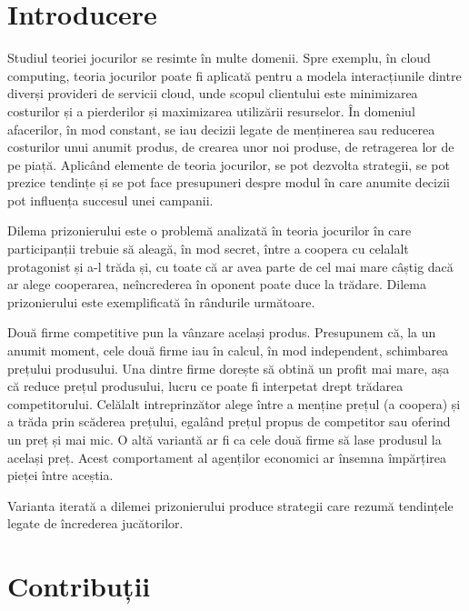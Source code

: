 \chapter*{Introducere}

Studiul teoriei jocurilor se resimte în multe domenii. Spre exemplu, în cloud computing, teoria jocurilor poate fi aplicată pentru a modela interacțiunile dintre diverși provideri de servicii cloud, unde scopul clientului este minimizarea costurilor și a pierderilor și maximizarea utilizării resurselor. În domeniul afacerilor, în mod constant, se iau decizii legate de menținerea sau reducerea costurilor unui anumit produs, de crearea unor noi produse, de retragerea lor de pe piață. Aplicând elemente de teoria jocurilor, se pot dezvolta strategii, se pot prezice tendințe și se pot face presupuneri despre modul în care anumite decizii pot influența succesul unei campanii. 

Dilema prizonierului este o problemă analizată în teoria jocurilor în care participanții trebuie să aleagă, în mod secret, între a coopera cu celalalt protagonist și a-l trăda și, cu toate că ar avea parte de cel mai mare câștig dacă ar alege cooperarea, neîncrederea în oponent poate duce la trădare.  Dilema prizonierului este exemplificată în rândurile următoare. 
 
Două firme competitive pun la vânzare același produs. Presupunem că, la un anumit moment, cele două firme iau în calcul, în mod independent, schimbarea prețului produsului. Una dintre firme dorește să obtină un profit mai mare, așa că reduce prețul produsului, lucru ce poate fi interpetat drept trădarea competitorului. Celălalt intreprinzător alege între a menține prețul (a coopera) și a trăda prin scăderea prețului, egalând prețul propus de competitor sau oferind un preț și mai mic. O altă variantă ar fi ca cele două firme să lase produsul la același preț. Acest comportament al agenților economici ar însemna împărțirea pieței între aceștia. 
  
Varianta iterată a dilemei prizonierului produce strategii care rezumă tendințele legate de încrederea jucătorilor.  

\chapter*{Contribuții}